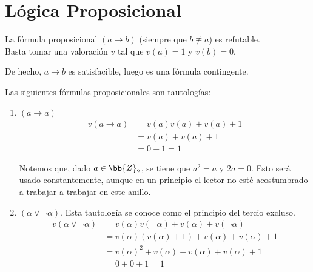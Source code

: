 \section{Lógica Proposicional}

\begin{ejemplo}
    La fórmula proposicional $(a\to b)$ (siempre que $b\not\equiv a$) es refutable.\\

    Basta tomar una valoración $v$ tal que $v(a)=1$ y $v(b)=0$.

    De hecho, $a\to b$ es satisfacible, luego es una fórmula contingente.
\end{ejemplo}

\begin{ejemplo}
    Las siguientes fórmulas proposicionales son tautologías:
    \begin{enumerate}
        \item $(a\rightarrow a)$
        \begin{align*}
            v(a\rightarrow a) &= v(a)v(a)+v(a)+1 \\
                     &= v(a) + v(a) + 1 \\
                     &= 0 + 1 = 1
        \end{align*}
        \begin{observacion}
            Notemos que, dado $a\in \bb{Z}_2$, se tiene que $a^2=a$ y $2a=0$.
            Esto será usado constantemente, aunque en un principio el lector no
            esté acostumbrado a trabajar a trabajar en este anillo.
        \end{observacion}

        \item $(\alpha\lor \lnot \alpha)$. Esta tautología se conoce como el principio del tercio excluso.
        \begin{align*}
            v(\alpha\lor \lnot \alpha) &= v(\alpha)v(\lnot \alpha) + v(\alpha) + v(\lnot \alpha)\\
                                      &= v(\alpha)(v(\alpha)+1) + v(\alpha) + v(\alpha) + 1 \\
                                      &= v(\alpha)^2 + v(\alpha) + v(\alpha) + v(\alpha) + 1\\
                                      &= 0 + 0 + 1 = 1
        \end{align*}
    \end{enumerate}
\end{ejemplo}

